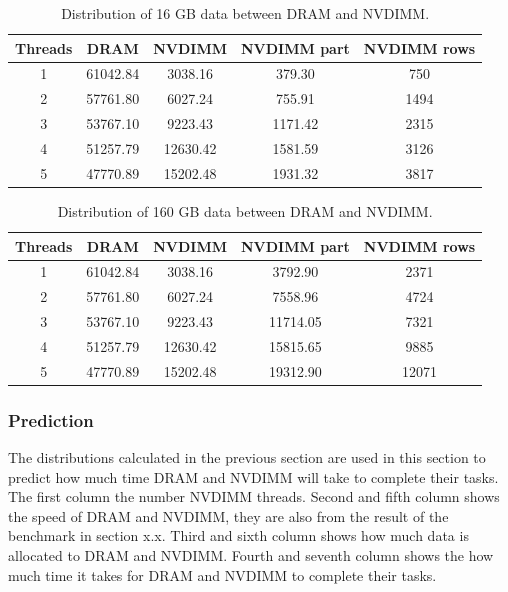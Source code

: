 \documentclass[12pt,a4paper,USenglish]{article}      %
\begin{document}
\begin{table}[!hbtp]
\centering
\begin{tabular}{ |c|c|c|c|c| } 
\hline
Threads & DRAM & NVDIMM & NVDIMM part & NVDIMM rows \\
\hline
1 & 61042.84 & 3038.16 & 379.30 & 750 \\
\hline
2 & 57761.80 & 6027.24 & 755.91 & 1494 \\
\hline
3 & 53767.10 & 9223.43 & 1171.42 & 2315 \\
\hline
4 & 51257.79 & 12630.42 & 1581.59 & 3126 \\
\hline
5 & 47770.89 & 15202.48 & 1931.32 & 3817 \\
\hline
\end{tabular}
\caption{Distribution of 16 GB data between DRAM and NVDIMM.}
\label{tab:distribution16GB}
\end{table}

\begin{table}[!hbtp]
\centering
\begin{tabular}{ |c|c|c|c|c| } 
\hline
Threads & DRAM & NVDIMM & NVDIMM part & NVDIMM rows \\
\hline
1 & 61042.84 & 3038.16 & 3792.90 & 2371 \\
\hline
2 & 57761.80 & 6027.24 & 7558.96 & 4724 \\
\hline
3 & 53767.10 & 9223.43 & 11714.05 & 7321 \\
\hline
4 & 51257.79 & 12630.42 & 15815.65 & 9885 \\
\hline
5 & 47770.89 & 15202.48 & 19312.90 & 12071 \\
\hline
\end{tabular}
\caption{Distribution of 160 GB data between DRAM and NVDIMM.}
\label{tab:distribution160GB}
\end{table}

\subsubsection{Prediction}
The distributions calculated in the previous section are used in this section to predict how much time DRAM and NVDIMM will take to complete their tasks.
The first column the number NVDIMM threads. Second and fifth column shows the speed of DRAM and NVDIMM, they are also from the result of the benchmark in section x.x.
Third and sixth column shows how much data is allocated to DRAM and NVDIMM. Fourth and seventh column shows the how much time it takes for DRAM and NVDIMM to complete their tasks.
\end{document}
